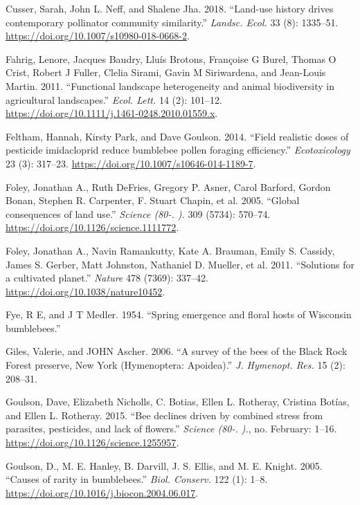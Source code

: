 \documentclass[11pt,]{article}
\begin{document}
\leavevmode\hypertarget{ref-Cusser2018}{}%
Cusser, Sarah, John L. Neff, and Shalene Jha. 2018. ``Land-use history
drives contemporary pollinator community similarity.'' \emph{Landsc.
Ecol.} 33 (8): 1335--51.
\url{https://doi.org/10.1007/s10980-018-0668-2}.

\leavevmode\hypertarget{ref-Fahrig2011b}{}%
Fahrig, Lenore, Jacques Baudry, Lluís Brotons, Françoise G Burel, Thomas
O Crist, Robert J Fuller, Clelia Sirami, Gavin M Siriwardena, and
Jean-Louis Martin. 2011. ``Functional landscape heterogeneity and animal
biodiversity in agricultural landscapes.'' \emph{Ecol. Lett.} 14 (2):
101--12. \url{https://doi.org/10.1111/j.1461-0248.2010.01559.x}.

\leavevmode\hypertarget{ref-Feltham2014}{}%
Feltham, Hannah, Kirsty Park, and Dave Goulson. 2014. ``Field realistic
doses of pesticide imidacloprid reduce bumblebee pollen foraging
efficiency.'' \emph{Ecotoxicology} 23 (3): 317--23.
\url{https://doi.org/10.1007/s10646-014-1189-7}.

\leavevmode\hypertarget{ref-Foley2005a}{}%
Foley, Jonathan A., Ruth DeFries, Gregory P. Asner, Carol Barford,
Gordon Bonan, Stephen R. Carpenter, F. Stuart Chapin, et al. 2005.
``Global consequences of land use.'' \emph{Science (80-. ).} 309 (5734):
570--74. \url{https://doi.org/10.1126/science.1111772}.

\leavevmode\hypertarget{ref-Foley2011b}{}%
Foley, Jonathan A., Navin Ramankutty, Kate A. Brauman, Emily S. Cassidy,
James S. Gerber, Matt Johnston, Nathaniel D. Mueller, et al. 2011.
``Solutions for a cultivated planet.'' \emph{Nature} 478 (7369):
337--42. \url{https://doi.org/10.1038/nature10452}.

\leavevmode\hypertarget{ref-Fye1954a}{}%
Fye, R E, and J T Medler. 1954. ``Spring emergence and floral hosts of
Wisconsin bumblebees.''

\leavevmode\hypertarget{ref-Giles2006}{}%
Giles, Valerie, and JOHN Ascher. 2006. ``A survey of the bees of the
Black Rock Forest preserve, New York (Hymenoptera: Apoidea).'' \emph{J.
Hymenopt. Res.} 15 (2): 208--31.

\leavevmode\hypertarget{ref-Goulson2015c}{}%
Goulson, Dave, Elizabeth Nicholls, C. Botias, Ellen L. Rotheray,
Cristina Botías, and Ellen L. Rotheray. 2015. ``Bee declines driven by
combined stress from parasites, pesticides, and lack of flowers.''
\emph{Science (80-. ).}, no. February: 1--16.
\url{https://doi.org/10.1126/science.1255957}.

\leavevmode\hypertarget{ref-Goulson2005b}{}%
Goulson, D., M. E. Hanley, B. Darvill, J. S. Ellis, and M. E. Knight.
2005. ``Causes of rarity in bumblebees.'' \emph{Biol. Conserv.} 122 (1):
1--8. \url{https://doi.org/10.1016/j.biocon.2004.06.017}.
\end{document}
